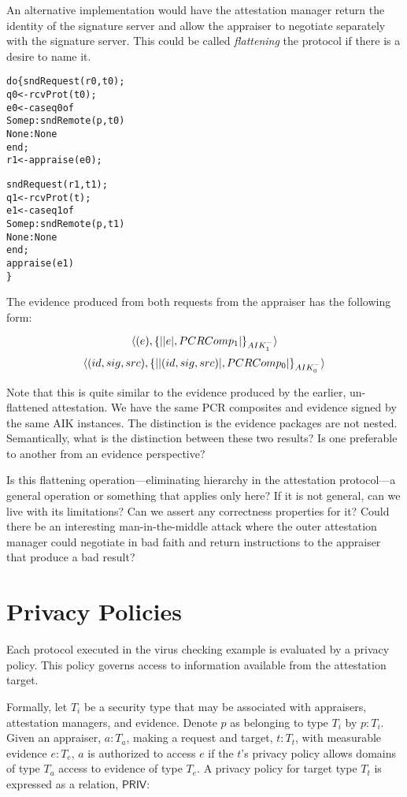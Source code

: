\documentclass[10pt]{article}
\begin{document}
An alternative implementation would have the attestation manager
return the identity of the signature server and allow the appraiser to
negotiate separately with the signature server.  This could be called
\emph{flattening} the protocol if there is a desire to name it.

\begin{alltt}
  do \{ sndRequest(r0,t0);
       q0 <- rcvProt(t0);
       e0 <- case q0 of
               Some p : sndRemote(p,t0)
               None : None
             end;
       r1 <- appraise(e0);
       
       sndRequest(r1,t1);
       q1 <- rcvProt(t);
       e1 <- case q1 of
               Some p : sndRemote(p,t1)
               None : None
             end;
       appraise(e1)
  \}
\end{alltt}

The evidence produced from both requests from the appraiser has the
following form:

\[\langle (e),\{\lvert \lvert e \rvert,PCRComp_1\rvert\}_{AIK_1^{-}}\rangle\]
\[\langle (id,sig,src),\{\lvert \lvert (id,sig,src) \rvert,PCRComp_0\rvert\}_{AIK_0^{-}}\rangle\]

Note that this is quite similar to the evidence produced by the
earlier, un-flattened attestation.  We have the same PCR composites
and evidence signed by the same AIK instances.  The distinction is the
evidence packages are not nested.  Semantically, what is the
distinction between these two results?  Is one preferable to another
from an evidence perspective?

Is this flattening operation---eliminating hierarchy in the
attestation protocol---a general operation or something that applies
only here?  If it is not general, can we live with its limitations?
Can we assert any correctness properties for it?  Could there be an
interesting man-in-the-middle attack where the outer attestation
manager could negotiate in bad faith and return instructions to the
appraiser that produce a bad result?

\section*{Privacy Policies}

Each protocol executed in the virus checking example is evaluated by a
privacy policy.  This policy governs access to information available
from the attestation target.  

Formally, let $T_i$ be a security type that may be associated with
appraisers, attestation managers, and evidence.  Denote $p$ as
belonging to type $T_i$ by $p:T_i$.  Given an appraiser, $a:T_a$,
making a request and target, $t:T_t$, with measurable evidence
$e:T_e$, $a$ is authorized to access $e$ if the $t$'s privacy policy
allows domains of type $T_a$ access to evidence of type $T_e$. A
privacy policy for target type $T_t$ is expressed as a relation,
$\mathsf{PRIV}$:
\end{document}
